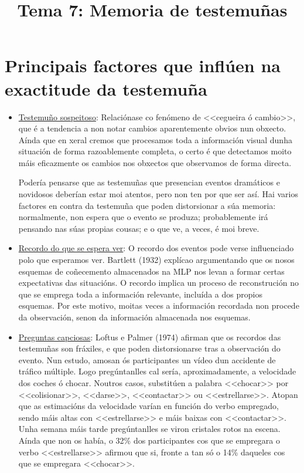 \documentclass[a4paper,11pt]{article}
\title{Tema 7: Memoria de testemuñas}
\date{}
\begin{document}
  

\maketitle

\section{Principais factores que inflúen na exactitude da testemuña}
\begin{itemize}
	\item \underline{Testemuño sospeitoso}: Relaciónase co fenómeno de <<cegueira ó cambio>>, que é 
	a tendencia a non notar cambios aparentemente obvios nun obxecto. Aínda que en xeral cremos que 
	procesamos toda a información visual dunha situación de forma razoablemente completa, o certo é 
	que detectamos moito máis eficazmente os cambios nos obxectos que observamos de forma directa. 
	
	Podería pensarse que as testemuñas que presencian eventos dramáticos e novidosos deberían estar
	moi atentos, pero non ten por que ser así. Hai varios factores en contra da testemuña que poden
	distorsionar a súa memoria: normalmente, non espera que o evento se produza; probablemente irá 
	pensando nas súas propias cousas; e o que ve, a veces, é moi breve.
	\item \underline{Recordo do que se espera ver}: O recordo dos eventos pode verse influenciado
	polo que esperamos ver. Bartlett (1932) explícao argumentando que os nosos esquemas de
	coñecemento almacenados na MLP nos levan a formar certas expectativas das situacións. O recordo
	implica un proceso de reconstrución no que se emprega toda a información relevante, incluída a
	dos propios esquemas. Por este motivo, moitas veces a información recordada non procede da
	observación, senon da información almacenada nos esquemas.
	
	\item \underline{Preguntas capciosas}: Loftus e Palmer (1974) afirman que os recordos das 
	testemuñas son fráxiles, e que poden distorsionarse tras a observación do evento. Nun estudo,
	amosan ós participantes un vídeo dun accidente de tráfico múltiple. Logo pregúntanlles cal 
	sería, aproximadamente, a velocidade dos coches ó chocar. Noutros casos, substitúen a palabra 
	<<chocar>> por <<colisionar>>, <<darse>>, <<contactar>> ou <<estrellarse>>. Atopan que as 
	estimacións da velocidade varían en función do verbo empregado, sendo máis altas con 
	<<estrellarse>> e máis baixas con <<contactar>>. Unha semana máis tarde pregúntanlles se viron 
	cristales rotos na escena. Aínda que non os había, o 32\% dos participantes cos que se empregara 
	o verbo <<estrellarse>> afirmou que si, fronte a tan só o 14\% daqueles cos que se empregara 
	<<chocar>>.
	

\end{itemize}
\end{document}
